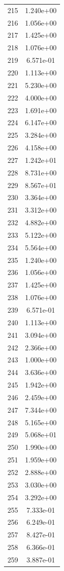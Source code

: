\documentclass[12pt]{article}
\begin{document}
\begin{longtable}{@{}cc@{}}
215 & 1.240e+00 \\
216 & 1.056e+00 \\
217 & 1.425e+00 \\
218 & 1.076e+00 \\
219 & 6.571e-01 \\
220 & 1.113e+00 \\
221 & 5.230e+00 \\
222 & 4.000e+00 \\
223 & 1.691e+00 \\
224 & 6.147e+00 \\
225 & 3.284e+00 \\
226 & 4.158e+00 \\
227 & 1.242e+01 \\
228 & 8.731e+00 \\
229 & 8.567e+01 \\
230 & 3.364e+00 \\
231 & 3.312e+00 \\
232 & 4.882e+00 \\
233 & 5.122e+00 \\
234 & 5.564e+00 \\
235 & 1.240e+00 \\
236 & 1.056e+00 \\
237 & 1.425e+00 \\
238 & 1.076e+00 \\
239 & 6.571e-01 \\
240 & 1.113e+00 \\
241 & 3.094e+00 \\
242 & 2.366e+00 \\
243 & 1.000e+00 \\
244 & 3.636e+00 \\
245 & 1.942e+00 \\
246 & 2.459e+00 \\
247 & 7.344e+00 \\
248 & 5.165e+00 \\
249 & 5.068e+01 \\
250 & 1.990e+00 \\
251 & 1.959e+00 \\
252 & 2.888e+00 \\
253 & 3.030e+00 \\
254 & 3.292e+00 \\
255 & 7.333e-01 \\
256 & 6.249e-01 \\
257 & 8.427e-01 \\
258 & 6.366e-01 \\
259 & 3.887e-01 \\

\end{longtable}
\end{document}
